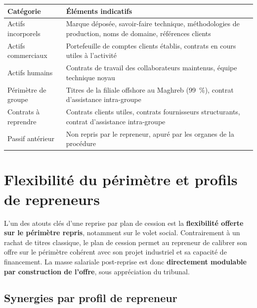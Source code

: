 \documentclass[11pt,a4paper]{article}
\begin{document}
\begin{longtable}{L{4.5cm}L{10.5cm}}
\toprule
\textbf{Catégorie} & \textbf{Éléments indicatifs} \\
\midrule
\endhead
Actifs incorporels & Marque déposée, savoir-faire technique, méthodologies de production, noms de domaine, références clients \\
Actifs commerciaux & Portefeuille de comptes clients établis, contrats en cours utiles à l'activité \\
Actifs humains & Contrats de travail des collaborateurs maintenus, équipe technique noyau \\
Périmètre de groupe & Titres de la filiale offshore au Maghreb (99~\%), contrat d'assistance intra-groupe \\
Contrats à reprendre & Contrats clients utiles, contrats fournisseurs structurants, contrat d'assistance intra-groupe \\
Passif antérieur & Non repris par le repreneur, apuré par les organes de la procédure \\
\bottomrule
\end{longtable}

\section{Flexibilité du périmètre et profils de repreneurs}

L'un des atouts clés d'une reprise par plan de cession est la \textbf{flexibilité offerte sur le périmètre repris}, notamment sur le volet social. Contrairement à un rachat de titres classique, le plan de cession permet au repreneur de calibrer son offre sur le périmètre cohérent avec son projet industriel et sa capacité de financement. La masse salariale post-reprise est donc \textbf{directement modulable par construction de l'offre}, sous appréciation du tribunal.

\subsection{Synergies par profil de repreneur}
\end{document}
